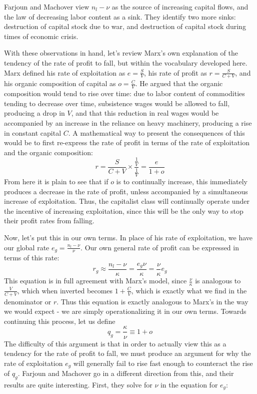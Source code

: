 Farjoun and Machover view $n_l-\nu$ as the source of increasing capital flows, and the law of decreasing labor content as a sink. They identify two more sinks: destruction of capital stock due to war, and destruction of capital stock during times of economic crisis. \par 
With these observations in hand, let's review Marx's own explanation of the tendency of the rate of profit to fall, but within the vocabulary developed here. Marx defined his rate of exploitation as $e = \frac{S}{V}$, his rate of profit as $r = \frac{S}{C+V}$, and his organic composition of capital as $o =\frac{C}{V}$. He argued that the organic composition would tend to rise over time: due to labor content of commodities tending to decrease over time, subsistence wages would be allowed to fall, producing a drop in $V$, and that this reduction in real wages would be accompanied by an increase in the reliance on heavy machinery, producing a rise in constant capital $C$. A mathematical way to present the consequences of this would be to first re-express the rate of profit in terms of the rate of exploitation and the organic composition:
\[ r = \frac{S}{C+V}\times \frac{\frac{1}{V}}{\frac{1}{V}} = \frac{e}{1+o} \]
From here it is plain to see that if $o$ is to continually increase, this immediately produces a decrease in the rate of profit, unless accompanied by a simultaneous increase of exploitation. Thus, the capitalist class will continually operate under the incentive of increasing exploitation, since this will be the only way to stop their profit rates from falling. \par 
Now, let's put this in our own terms. In place of his rate of exploitation, we have our global rate $e_g = \frac{n_l-\nu}{\nu}$. Our own general rate of profit can be expressed in terms of this rate:
\[ r_g \approx \frac{n_l-\nu}{\kappa} = \frac{e_g\nu}{\kappa} = \frac{\nu}{\kappa}e_g \]
This equation is in full agreement with Marx's model, since $\frac{\nu}{\kappa}$ is analogous to $\frac{V}{C+V}$, which when inverted becomes $1+\frac{C}{V}$, which is exactly what we find in the denominator or $r$. Thus this equation is exactly analogous to Marx's in the way we would expect - we are simply operationalizing it in our own terms. Towards continuing this process, let us define 
\[ q_g = \frac{\kappa}{\nu} \equiv 1+o \]
The difficulty of this argument is that in order to actually view this as a tendency for the rate of profit to fall, we must produce an argument for why the rate of exploitation $e_g$ will generally fail to rise fast enough to counteract the rise of $q_g$. Farjoun and Machover go in a different direction from this, and their results are quite interesting. First, they solve for $\nu$ in the equation for $e_g$:
